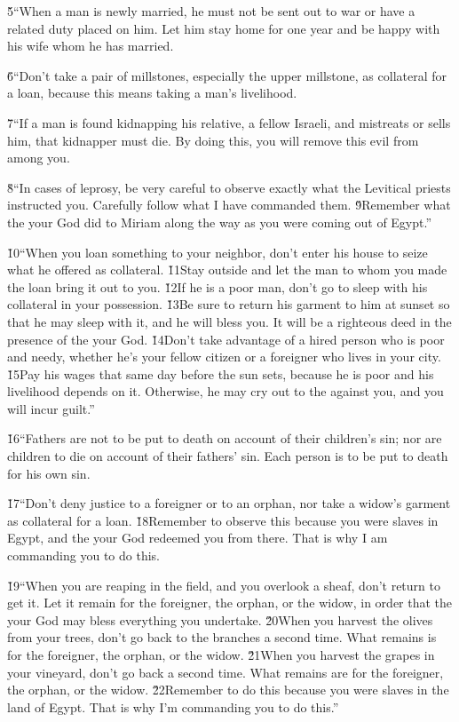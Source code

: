 \v{5}``When a man is newly married, he must not be sent out to war or have a related duty placed on him. Let him stay home for one year and be happy with his wife whom he has married.

\v{6}``Don't take a pair of millstones, especially the upper millstone, as collateral for a loan, because this means taking a man's livelihood.

\v{7}``If a man is found kidnapping his relative, a fellow Israeli, and mistreats or sells him, that kidnapper must die. By doing this, you will remove this evil from among you.

\v{8}``In cases of leprosy, be very careful to observe exactly what the Levitical priests instructed you. Carefully follow what I have commanded them. \v{9}Remember what the  your God did to Miriam along the way as you were coming out of Egypt.''

\v{10}``When you loan something to your neighbor, don't enter his house to seize what he offered as collateral. \v{11}Stay outside and let the man to whom you made the loan bring it out to you. \v{12}If he is a poor man, don't go to sleep with his collateral in your possession. \v{13}Be sure to return his garment to him at sunset so that he may sleep with it, and he will bless you. It will be a righteous deed in the presence of the  your God. \v{14}Don't take advantage of a hired person who is poor and needy, whether he's your fellow citizen or a foreigner who lives in your city. \v{15}Pay his wages that same day before the sun sets, because he is poor and his livelihood depends on it. Otherwise, he may cry out to the  against you, and you will incur guilt.''

\v{16}``Fathers are not to be put to death on account of their children's sin; nor are children to die on account of their fathers' sin. Each person is to be put to death for his own sin.

\v{17}``Don't deny justice to a foreigner or to an orphan, nor take a widow's garment as collateral for a loan. \v{18}Remember to observe this because you were slaves in Egypt, and the  your God redeemed you from there. That is why I am commanding you to do this.

\v{19}``When you are reaping in the field, and you overlook a sheaf, don't return to get it. Let it remain for the foreigner, the orphan, or the widow, in order that the  your God may bless everything you undertake. \v{20}When you harvest the olives from your trees, don't go back to the branches a second time. What remains is for the foreigner, the orphan, or the widow. \v{21}When you harvest the grapes in your vineyard, don't go back a second time. What remains are for the foreigner, the orphan, or the widow. \v{22}Remember to do this because you were slaves in the land of Egypt. That is why I'm commanding you to do this.''

